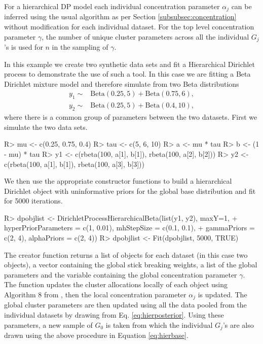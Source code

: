 \documentclass[nojss]{jss}
\begin{document}
For a hierarchical DP model each individual concentration parameter $\alpha _j$ can be inferred using the usual algorithm as per Section \ref{subsubsec:concentration} without modification for each individual dataset. For the top level concentration parameter $\gamma$, the number of unique cluster parameters across all the individual $G_j$'s is used for $n$ in the sampling of $\gamma$.

In this example we create two synthetic data sets and fit a Hierarchical Dirichlet process to demonstrate the use of such a tool. In this case we are fitting a Beta Dirichlet mixture model and therefore simulate from two Beta distributions
\begin{align*}
y_1 \sim & \text{Beta}(0.25, 5) + \text{Beta}(0.75, 6), \\
y_2 \sim & \text{Beta}(0.25, 5) + \text{Beta}(0.4, 10),
\end{align*}
where there is a common group of parameters between the two datasets. First we simulate the two data sets.
\begin{Schunk}
\begin{Sinput}
R> mu <- c(0.25, 0.75, 0.4)
R> tau <- c(5, 6, 10)
R> a <- mu * tau
R> b <- (1 - mu) * tau
R> y1 <- c(rbeta(100, a[1], b[1]), rbeta(100, a[2], b[2]))
R> y2 <- c(rbeta(100, a[1], b[1]), rbeta(100, a[3], b[3]))
\end{Sinput}
\end{Schunk}
We then use the appropriate constructor functions to build a hierarchical Dirichlet object with uninformative priors for the global base distribution and fit for 5000 iterations.
\begin{Schunk}
\begin{Sinput}
R> dpobjlist <- DirichletProcessHierarchicalBeta(list(y1, y2), maxY=1,
+  hyperPriorParameters = c(1, 0.01), mhStepSize = c(0.1, 0.1),
+  gammaPriors = c(2, 4), alphaPriors = c(2, 4))
R> dpobjlist <- Fit(dpobjlist, 5000, TRUE)
\end{Sinput}
\end{Schunk}

The creator function  returns a list of  objects for each dataset (in this case two objects), a vector containing the global stick breaking weights, a list of the global parameters and the variable containing the global concentration parameter $\gamma$. The function  updates the cluster allocations locally of each  object using Algorithm 8 from \cite{neal_markov_2000}, then the local concentration parameter $\alpha _j$ is updated. The global cluster parameters are then updated using all the data pooled from the individual datasets by drawing from Eq. \eqref{eq:hierposterior}. Using these parameters, a new sample of $G_0$ is taken from which the individual $G_j$'s are also drawn using the above procedure in Equation \ref{eq:hierbase}.
\end{document}
